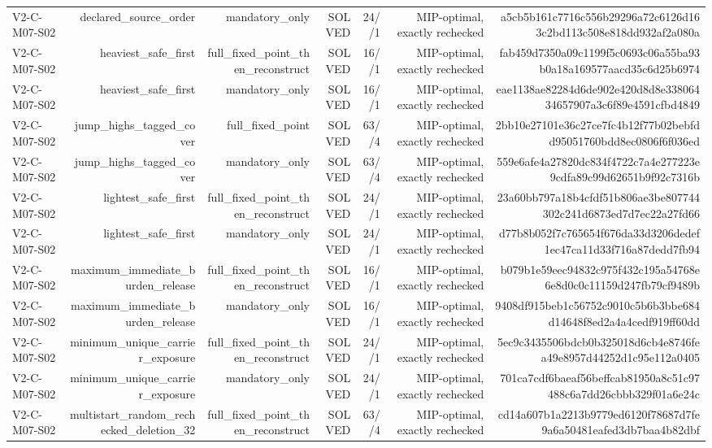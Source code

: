 {\begin{longtable}{lrrrrrr}
V2-C-M07-S02 & declared\_source\_order & mandatory\_only & SOLVED & 24//1 & MIP-optimal, exactly rechecked & a5cb5b161c7716c556b29296a72c6126d163c2bd113c508e818dd932af2a080a \\
V2-C-M07-S02 & heaviest\_safe\_first & full\_fixed\_point\_then\_reconstruct & SOLVED & 16//1 & MIP-optimal, exactly rechecked & fab459d7350a09c1199f5c0693c06a55ba93b0a18a169577aacd35c6d25b6974 \\
V2-C-M07-S02 & heaviest\_safe\_first & mandatory\_only & SOLVED & 16//1 & MIP-optimal, exactly rechecked & eae1138ae82284d6de902e420d8d8e33806434657907a3c6f89e4591cfbd4849 \\
V2-C-M07-S02 & jump\_highs\_tagged\_cover & full\_fixed\_point & SOLVED & 63//4 & MIP-optimal, exactly rechecked & 2bb10e27101e36c27ce7fc4b12f77b02bebfdd95051760bdd8ec0806f6f036ed \\
V2-C-M07-S02 & jump\_highs\_tagged\_cover & mandatory\_only & SOLVED & 63//4 & MIP-optimal, exactly rechecked & 559e6afe4a27820dc834f4722c7a4e277223e9cdfa89c99d62651b9f92c7316b \\
V2-C-M07-S02 & lightest\_safe\_first & full\_fixed\_point\_then\_reconstruct & SOLVED & 24//1 & MIP-optimal, exactly rechecked & 23a60bb797a18b4cfdf51b806ae3be807744302c241d6873ed7d7ec22a27fd66 \\
V2-C-M07-S02 & lightest\_safe\_first & mandatory\_only & SOLVED & 24//1 & MIP-optimal, exactly rechecked & d77b8b052f7c765654f676da33d3206dedef1ec47ca11d33f716a87dedd7fb94 \\
V2-C-M07-S02 & maximum\_immediate\_burden\_release & full\_fixed\_point\_then\_reconstruct & SOLVED & 16//1 & MIP-optimal, exactly rechecked & b079b1e59eec94832c975f432c195a54768e6e8d0c0c11159d247fb79cf9489b \\
V2-C-M07-S02 & maximum\_immediate\_burden\_release & mandatory\_only & SOLVED & 16//1 & MIP-optimal, exactly rechecked & 9408df915beb1c56752c9010c5b6b3bbe684d14648f8ed2a4a4cedf919ff60dd \\
V2-C-M07-S02 & minimum\_unique\_carrier\_exposure & full\_fixed\_point\_then\_reconstruct & SOLVED & 24//1 & MIP-optimal, exactly rechecked & 5ec9c3435506bdcb0b325018d6cb4e8746fea49e8957d44252d1c95e112a0405 \\
V2-C-M07-S02 & minimum\_unique\_carrier\_exposure & mandatory\_only & SOLVED & 24//1 & MIP-optimal, exactly rechecked & 701ca7cdf6baeaf56beffcab81950a8c51c97488c6a7dd26cbbb329f01a6e24c \\
V2-C-M07-S02 & multistart\_random\_rechecked\_deletion\_32 & full\_fixed\_point\_then\_reconstruct & SOLVED & 63//4 & MIP-optimal, exactly rechecked & cd14a607b1a2213b9779ed6120f78687d7fe9a6a50481eafed3db7baa4b82dbf \\

\end{longtable}}
